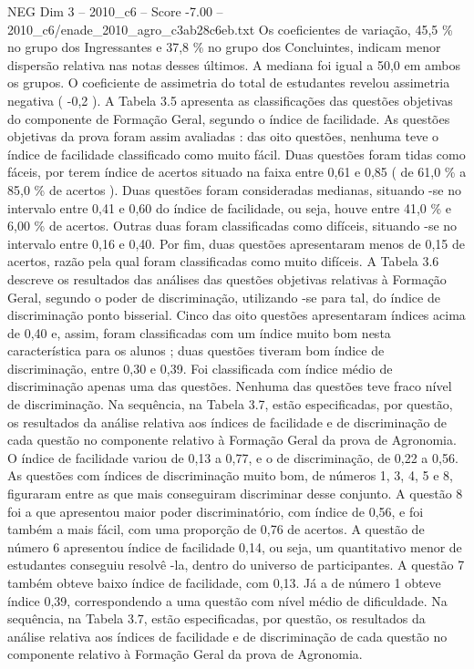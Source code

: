 \begin{textsample}{NEG Dim 3 – 2010\_c6 – Score -7.00 – 2010\_c6/enade\_2010\_agro\_c3ab28c6eb.txt}
Os coeficientes de variação, 45,5 \% no grupo dos Ingressantes e 37,8 \% no grupo dos Concluintes, indicam menor dispersão relativa nas notas desses últimos.
A mediana foi igual a 50,0 em ambos os grupos.
O coeficiente de assimetria do total de estudantes revelou assimetria negativa ( -0,2 ).
A Tabela 3.5 apresenta as classificações das questões objetivas do componente de Formação Geral, segundo o índice de facilidade.
As questões objetivas da prova foram assim avaliadas : das oito questões, nenhuma teve o índice de facilidade classificado como muito fácil.
Duas questões foram tidas como fáceis, por terem índice de acertos situado na faixa entre 0,61 e 0,85 ( de 61,0 \% a 85,0 \% de acertos ).
Duas questões foram consideradas medianas, situando -se no intervalo entre 0,41 e 0,60 do índice de facilidade, ou seja, houve entre 41,0 \% e 6,00 \% de acertos.
Outras duas foram classificadas como difíceis, situando -se no intervalo entre 0,16 e 0,40.
Por fim, duas questões apresentaram menos de 0,15 de acertos, razão pela qual foram classificadas como muito difíceis.
A Tabela 3.6 descreve os resultados das análises das questões objetivas relativas à Formação Geral, segundo o poder de discriminação, utilizando -se para tal, do índice de discriminação ponto bisserial.
Cinco das oito questões apresentaram índices acima de 0,40 e, assim, foram classificadas com um índice muito bom nesta característica para os alunos ; duas questões tiveram bom índice de discriminação, entre 0,30 e 0,39.
Foi classificada com índice médio de discriminação apenas uma das questões.
Nenhuma das questões teve fraco nível de discriminação.
Na sequência, na Tabela 3.7, estão especificadas, por questão, os resultados da análise relativa aos índices de facilidade e de discriminação de cada questão no componente relativo à Formação Geral da prova de Agronomia.
O índice de facilidade variou de 0,13 a 0,77, e o de discriminação, de 0,22 a 0,56.
As questões com índices de discriminação muito bom, de números 1, 3, 4, 5 e 8, figuraram entre as que mais conseguiram discriminar desse conjunto.
A questão 8 foi a que apresentou maior poder discriminatório, com índice de 0,56, e foi também a mais fácil, com uma proporção de 0,76 de acertos.
A questão de número 6 apresentou índice de facilidade 0,14, ou seja, um quantitativo menor de estudantes conseguiu resolvê -la, dentro do universo de participantes.
A questão 7 também obteve baixo índice de facilidade, com 0,13.
Já a de número 1 obteve índice 0,39, correspondendo a uma questão com nível médio de dificuldade.
Na sequência, na Tabela 3.7, estão especificadas, por questão, os resultados da análise relativa aos índices de facilidade e de discriminação de cada questão no componente relativo à Formação Geral da prova de Agronomia.

\end{textsample}
